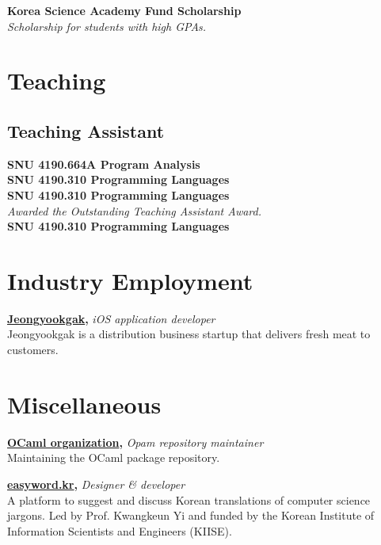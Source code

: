 \documentclass[a4paper,10pt,oneside]{memoir}
\begin{document}
\textbf{\textsf{Korea Science Academy Fund Scholarship}}\\
\textit{Scholarship for students with high GPAs.}


\section{Teaching}
\subsection{Teaching Assistant}
\textbf{\textsf{SNU 4190.664A Program Analysis}}\\
\textbf{\textsf{SNU 4190.310 Programming Languages}}\\
\textbf{\textsf{SNU 4190.310 Programming Languages}}\\
\textit{Awarded the Outstanding Teaching Assistant Award.}\\
\textbf{\textsf{SNU 4190.310 Programming Languages}}


\section{Industry Employment}
\textbf{\textsf{\href{https://jeongyookgak.com}{Jeongyookgak},}} \textit{iOS application developer}\\
Jeongyookgak is a distribution business startup that delivers fresh meat to customers.

\section{Miscellaneous}
\textbf{\textsf{\href{https://github.com/orgs/ocaml/people?query=jay+lee}{OCaml organization},}} \textit{Opam repository maintainer}\\
Maintaining the OCaml package repository.
\vspace{0.5\onelineskip}

\textbf{\textsf{\href{https://easyword.kr/}{easyword.kr},}} \textit{Designer \& developer}\\
A platform to suggest and discuss Korean translations of computer science jargons. Led by Prof. Kwangkeun Yi and funded by the Korean Institute of Information Scientists and Engineers (KIISE).
\vspace{0.5\onelineskip}
\end{document}
